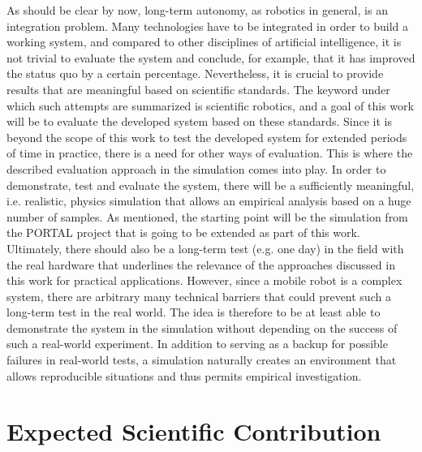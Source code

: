 \documentclass[english, master, expose, utf8]{base/thesis_KBS}
\begin{document}
As should be clear by now, long-term autonomy, as robotics in general, is an integration problem. Many technologies have to be integrated in order to build a working system, 
and compared to other disciplines of artificial intelligence, it is not trivial to evaluate the system and conclude, for example, that it has improved the status quo by a 
certain percentage. Nevertheless, it is crucial to provide results that are meaningful based on scientific standards. 
The keyword under which such attempts are summarized is scientific robotics, and a goal of this work will be to evaluate the developed system based on these standards.
Since it is beyond the scope of this work to test the developed system for extended periods of time in practice, there is a need for other ways of evaluation.
This is where the described evaluation approach in the simulation comes into play. In order to demonstrate, test and evaluate the system, there will be a sufficiently meaningful, 
i.e. realistic, physics simulation that allows an empirical analysis based on a huge number of samples. As mentioned, the starting point will be the simulation from the 
PORTAL project that is going to be extended as part of this work. Ultimately, there should also be a long-term test (e.g. one day) in the field with the real hardware that 
underlines the relevance of the approaches discussed in this work for practical applications. However, since a mobile robot is a complex system, there are arbitrary 
many technical barriers that could prevent such a long-term test in the real world. The idea is therefore to be at least able to demonstrate the system in the simulation
without depending on the success of such a real-world experiment. In addition to serving as a backup for possible failures in real-world tests,
a simulation naturally creates an environment that allows reproducible situations and thus permits empirical investigation.

\section{Expected Scientific Contribution}
\end{document}
